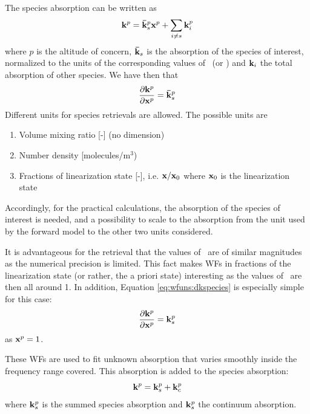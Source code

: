 The species absorption can be written as
 \begin{equation}
   \mathbf{k}^p = \mathbf{\bar{k}}^p_s \mathbf{x}^p + \sum_{i\ne s} \mathbf{k}^p_i
  \label{eq:wfuns:kspecies}
 \end{equation}
 where $p$ is the altitude of concern, $\mathbf{\bar{k}}_s$ is the
 absorption of the species of interest, normalized to the units of the
 corresponding values of \xt\ (or \bt) and $\mathbf{k}_i$ the total
 absorption of other species.
 We have then that
 \begin{equation}
   \frac{\partial \mathbf{k}^p}{\partial \mathbf{x}^p} = \mathbf{\bar{k}}^p_s
  \label{eq:wfuns:dkspecies}
 \end{equation}
 Different units for species retrievals are allowed. The possible units are
 \begin{enumerate}
    \item Volume mixing ratio [-] (no dimension)
    \item Number density [molecules/m$^3$)
    \item Fractions of linearization state [-], i.e. $\mathbf{x}/\mathbf{x}_0$ where
          $\mathbf{x}_0$ is the linearization state 
 \end{enumerate}
 Accordingly, for the practical calculations, the absorption of the
 species of interest is needed, and a possibility to scale to the
 absorption from the unit used by the forward model to the other two
 units considered.
 
 It is advantageous for the retrieval that the values of \xt\ are of
 similar magnitudes \citep{schimpf:97,eriksson:99} as the numerical
 precision is limited. This fact makes WFs
 in fractions of the linearization state (or rather, the a priori
 state) interesting as the values of \xt\ are then all around 1. In 
 addition, Equation \ref{eq:wfuns:dkspecies} is especially simple
 for this case:
 \begin{equation}
   \frac{\partial \mathbf{k}^p}{\partial \mathbf{x}^p} = \mathbf{k}^p_s
 \end{equation}
 as $\mathbf{x}^p=1$.


 \label{sec:wfuns:cont}

 These WFs are used to fit unknown absorption that varies smoothly inside
 the frequency range covered. This absorption
 is added to the species absorption:
 \begin{equation}
   \mathbf{k}^p = \mathbf{k}^p_s + \mathbf{k}^p_c
 \end{equation}
 where $\mathbf{k}^p_s$ is the summed species absorption and $\mathbf{k}^p_s$
 the continuum absorption.
 
